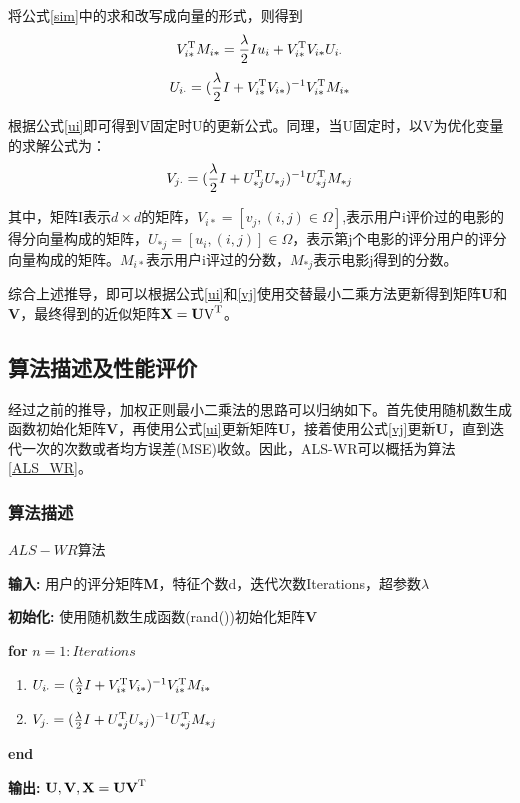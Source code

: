 \documentclass[11pt]{article}
\begin{document}
将公式\ref{sim}中的求和改写成向量的形式，则得到
\begin{equation}
	V_{i*}^{\rm T}M_{i*} = \frac{\lambda}{2}Iu_{i} +
	V_{i*}^{\rm T}V_{i*}U_{i\cdot}
\end{equation}
\begin{equation}
	U_{i\cdot} = (\frac{\lambda}{2}I + V_{i*}^{\rm T}V_{i*})^{-1}V_{i*}^{\rm T}M_{i*}
	\label{ui}
\end{equation}

根据公式\ref{ui}即可得到V固定时U的更新公式。同理，当U固定时，以V为优化变量的求解公式为：
\begin{equation}
	V_{j\cdot} = (\frac{\lambda}{2}I + U_{*j}^{\rm T}U_{*j})^{-1}U_{*j}^{\rm T}M_{*j}
	\label{vj}
\end{equation}

其中，矩阵I表示$d\times d$的矩阵，$V_{i*} = [v_j,(i,j)\in\Omega]$,表示用户i评价过的电影的得分向量构成的矩阵，$U_{*j} = [u_i,(i,j)]\in\Omega$，表示第j个电影的评分用户的评分向量构成的矩阵。$M_{i*}$表示用户i评过的分数，$M_{*j}$表示电影j得到的分数。

综合上述推导，即可以根据公式\ref{ui}和\ref{vj}使用交替最小二乘方法更新得到矩阵\textbf{U}和\textbf{V}，最终得到的近似矩阵$\textbf{X} = \textbf{U}\text{V}^{\rm T}$。

\subsection{算法描述及性能评价}

经过之前的推导，加权正则最小二乘法的思路可以归纳如下。首先使用随机数生成函数初始化矩阵\textbf{V}，再使用公式\ref{ui}更新矩阵\textbf{U}，接着使用公式\ref{vj}更新\textbf{U}，直到迭代一次的次数或者均方误差(MSE)收敛。因此，ALS-WR可以概括为算法\ref{ALS_WR}。

\subsubsection{算法描述}
\begin{algorithm}[!htbp]
\caption{$ALS-WR$算法}

\textbf{输入:} 用户的评分矩阵\textbf{M}，特征个数d，迭代次数Iterations，超参数$\lambda$

\textbf{初始化:} 使用随机数生成函数(rand())初始化矩阵\textbf{V}

\textbf{for} $n = 1:Iterations$ 
\begin{enumerate} 
  \item $U_{i\cdot} = (\frac{\lambda}{2}I + V_{i*}^{\rm T}V_{i*})^{-1}V_{i*}^{\rm T}M_{i*}$
  
  \item $V_{j\cdot} = (\frac{\lambda}{2}I + U_{*j}^{\rm T}U_{*j})^{-1}U_{*j}^{\rm T}M_{*j}$

\end{enumerate}
\textbf{end}

\textbf{输出:} $\textbf{U},\textbf{V},\textbf{X} =  \textbf{U}\textbf{V}^{\rm T}$
\label{ALS_WR}
\end{algorithm}
\end{document}
